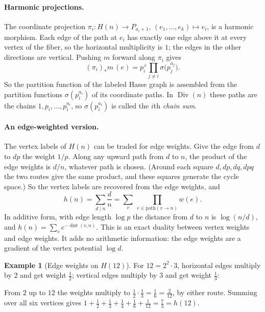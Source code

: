 \documentclass[11pt]{article}
\theoremstyle{definition}
\newtheorem{example}[theorem]{Example}
\theoremstyle{remark}
\begin{document}
\paragraph{Harmonic projections.}
The coordinate projection $\pi_i\colon H(n)\to P_{a_i+1}$,
$(e_1,\dots,e_k)\mapsto e_i$, is a harmonic morphism.  Each edge of the path
at $e_i$ has exactly one edge above it at every vertex of the fiber, so the
horizontal multiplicity is $1$; the edges in the other directions are
vertical.  Pushing $m$ forward along $\pi_i$ gives
\[
(\pi_i)_*m\,(e)=p_i^{\,e}\prod_{j\ne i}\sigma\bigl(p_j^{a_j}\bigr).
\]
So the partition function of the labeled Hasse graph is assembled from the
partition functions $\sigma(p_i^{a_i})$ of its coordinate paths.  In
$\operatorname{Div}(n)$ these paths are the chains $1,p_i,\dots,p_i^{a_i}$,
so $\sigma(p_i^{a_i})$ is called the $i$th \emph{chain sum}.

\paragraph{An edge-weighted version.}
The vertex labels of $H(n)$ can be traded for edge weights.  Give the edge
from $d$ to $dp$ the weight $1/p$.  Along any upward path from $d$ to $n$,
the product of the edge weights is $d/n$, whatever path is chosen.  (Around
each square $d,dp,dq,dpq$ the two routes give the same product, and these
squares generate the cycle space.)  So the vertex labels are recovered from
the edge weights, and
\[
h(n)=\sum_{d\mid n}\frac dn=\sum_{v}\ \prod_{e\in\text{path}(v\to n)}w(e).
\]
In additive form, with edge length $\log p$ the distance from $d$ to $n$ is
$\log(n/d)$, and $h(n)=\sum_v e^{-\operatorname{dist}(v,n)}$.  This is an
exact duality between vertex weights and edge weights.  It adds no
arithmetic information: the edge weights are a gradient of the vertex
potential $\log d$.

\begin{example}[Edge weights on $H(12)$]\label{ex:H12edges}
For $12=2^2\cdot3$, horizontal edges multiply by $2$ and get weight
$\tfrac12$; vertical edges multiply by $3$ and get weight $\tfrac13$:
\begin{center}
\end{center}
From $2$ up to $12$ the weights multiply to $\tfrac12\cdot\tfrac13=\tfrac16=\tfrac2{12}$,
by either route.  Summing over all six vertices gives
$1+\tfrac12+\tfrac13+\tfrac14+\tfrac16+\tfrac1{12}=\tfrac73=h(12)$.
\end{example}
\end{document}
